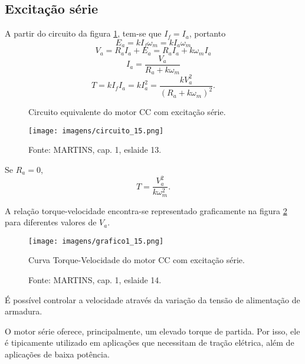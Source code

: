\subsection{Excitação série}
 
A partir do circuito da figura \ref{fig:C15}, tem-se que $I_{f}=I_{a}$, portanto
\[E_{a} = kI_{f}\omega_{m} = kI_{a}\omega_{m}\]
\[V_{a} = R_{a}I_{a} + E_{a} = R_{a}I_{a} + k\omega_{m}I_{a}\]
\[I_{a} = \frac{V_{a}}{R_{a} + k\omega_{m}}\]
\[T = kI_{f}I_{a} = kI_{a}^{2} = \frac{kV_{a}^{2}}{(R_{a} + k\omega_{m})^{2}}.\]
 
\begin{figure}[ht!]
\center
\caption{\label{fig:C15} Circuito equivalente do motor CC com excitação série.}
\texttt{[image: imagens/circuito\_15.png]}
\caption*{Fonte: MARTINS, cap. 1, eslaide 13.}
\end{figure}


Se $R_{a} = 0$,
\[T = \frac{V_{a}^{2}}{k\omega_{m}^{2}}.\]

A relação torque-velocidade encontra-se representado graficamente na figura \ref{fig:G1_15} para diferentes valores de $V_{a}$.

\begin{figure}[t!]
\center
\texttt{[image: imagens/grafico1\_15.png]}
\caption{\label{fig:G1_15}Curva Torque-Velocidade do motor CC com excitação série.}
\caption*{Fonte: MARTINS, cap. 1, eslaide 14.}
\end{figure}
 
É possível controlar a velocidade através da variação da tensão de alimentação de armadura.

O motor série oferece, principalmente, um elevado torque de partida. Por isso, ele é tipicamente utilizado em aplicações que necessitam de tração elétrica, além de aplicações de baixa potência.
